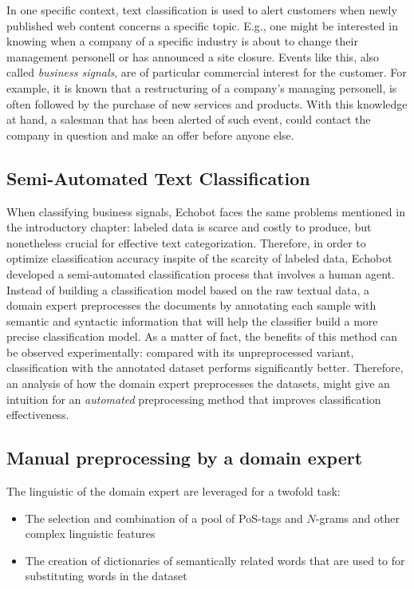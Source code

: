 In one specific context, text classification is used to alert customers when
newly published web content concerns a specific topic. E.g., one might
be interested in knowing when a company of a specific industry is about to change
their management personell or has announced a site closure.
Events like this, also called \textit{business signals}, are of particular
commercial interest for the customer. For example, it is known that a
restructuring of a company's managing personell, is often followed by the purchase of new
services and products. With this knowledge at hand, a salesman that has been
alerted of such event, could contact the company in question and make an offer
before anyone else.

\subsection{Semi-Automated Text Classification}

When classifying business signals, Echobot faces the same problems
mentioned in the introductory chapter: labeled data is scarce and costly to produce,
but nonetheless crucial for effective text categorization. Therefore, in order
to optimize classification accuracy inspite of the scarcity of labeled data, Echobot developed
a semi-automated classification process that involves a human agent. Instead of
building a classification model based on the raw textual data, a domain expert
preprocesses the documents by annotating each sample with semantic and
syntactic information that will help the classifier build a more precise
classification model. As a matter of fact, the benefits of this method can be
observed experimentally: compared with its unpreprocessed variant, classification with
the annotated dataset performs significantly better. Therefore, an analysis of
how the domain expert preprocesses the datasets, might give an intuition for
an \emph{automated} preprocessing method that improves classification
effectiveness.

\subsection{Manual preprocessing by a domain expert}
 
The linguistic of the domain expert are leveraged for a twofold task:

\begin{itemize}
  \item The selection and combination of a pool of PoS-tags and $N$-grams and
  other complex linguistic features
  \item The creation of dictionaries of semantically related words that are used
  to for substituting words in the dataset
\end{itemize}

